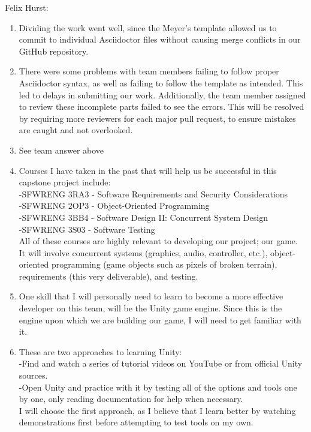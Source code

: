 \documentclass{article}
\begin{document}
Felix Hurst:
\begin{enumerate}
\item Dividing the work went well, since the Meyer’s template allowed us to commit to individual Asciidoctor files without causing merge conflicts in our GitHub repository.
\item There were some problems with team members failing to follow proper Asciidoctor syntax, as well as failing to follow the template as intended. This led to delays in submitting our work. Additionally, the team member assigned to review these incomplete parts failed to see the errors. This will be resolved by requiring more reviewers for each major pull request, to ensure mistakes are caught and not overlooked.
\item See team answer above
\item Courses I have taken in the past that will help us be successful in this capstone project include:\\
-SFWRENG 3RA3 - Software Requirements and Security Considerations\\
-SFWRENG 2OP3 - Object-Oriented Programming\\
-SFWRENG 3BB4 - Software Design II: Concurrent System Design\\
-SFWRENG 3S03 - Software Testing\\
All of these courses are highly relevant to developing our project; our game. It will involve concurrent systems (graphics, audio, controller, etc.), object-oriented programming (game objects such as pixels of broken terrain), requirements (this very deliverable), and testing.
\item One skill that I will personally need to learn to become a more effective developer on this team, will be the Unity game engine. Since this is the engine upon which we are building our game, I will need to get familiar with it.
\item These are two approaches to learning Unity:\\
-Find and watch a series of tutorial videos on YouTube or from official Unity sources.\\
-Open Unity and practice with it by testing all of the options and tools one by one, only reading documentation for help when necessary.\\
I will choose the first approach, as I believe that I learn better by watching demonstrations first before attempting to test tools on my own.
\end{enumerate}
\end{document}

